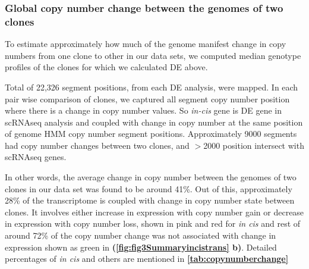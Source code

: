 \subsubsection{Global copy number change between the genomes of two clones}

To estimate approximately how much of the genome manifest change in copy numbers from one clone to other in our data sets, we computed median genotype profiles of the clones for which we calculated \ac{DE} above.

Total of 22,326 segment positions, from each DE analysis, were mapped. In each pair wise comparison of clones, we captured all segment copy number position where there is a change in copy number values. So \textit{in-cis} gene is DE gene in scRNAseq analysis and coupled with change in copy number at the same position of genome HMM copy number segment positions. Approximately 9000 segments had copy number changes between two clones, and $>$2000 position intersect with scRNAseq genes.

In other words, the average change in copy number between the genomes of two clones in our data set was found to be around 41\%. Out of this, approximately 28\% of the transcriptome is coupled with change in copy number state between clones. It involves either increase in expression with copy number gain or decrease in expression with copy number loss, shown in pink and red for \textit{in cis} and rest of  around 72\% of the copy number change was not associated with change in expression shown as green in \textbf{(\autoref{fig:fig3Summaryincistrans} b)}. Detailed percentages of \textit{in cis} and others are mentioned in 
\textbf{\autoref{tab:copynumberchange}}



